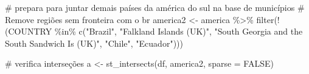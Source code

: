 \documentclass[
  letterpaper,
  DIV=11,
  numbers=noendperiod]{scrartcl}
\newenvironment{Shaded}{\begin{snugshade}}{\end{snugshade}}
\newcommand{\AttributeTok}[1]{\textcolor[rgb]{0.40,0.45,0.13}{#1}}
\newcommand{\CommentTok}[1]{\textcolor[rgb]{0.37,0.37,0.37}{#1}}
\newcommand{\ConstantTok}[1]{\textcolor[rgb]{0.56,0.35,0.01}{#1}}
\newcommand{\FunctionTok}[1]{\textcolor[rgb]{0.28,0.35,0.67}{#1}}
\newcommand{\NormalTok}[1]{\textcolor[rgb]{0.00,0.23,0.31}{#1}}
\newcommand{\OtherTok}[1]{\textcolor[rgb]{0.00,0.23,0.31}{#1}}
\newcommand{\SpecialCharTok}[1]{\textcolor[rgb]{0.37,0.37,0.37}{#1}}
\newcommand{\StringTok}[1]{\textcolor[rgb]{0.13,0.47,0.30}{#1}}
\begin{document}
\begin{Shaded}
\begin{Highlighting}[]
\CommentTok{\# prepara para juntar demais países da américa do sul na base de municípios}
\CommentTok{\# Remove regiões sem fronteira com o br}
\NormalTok{america2 }\OtherTok{\textless{}{-}}\NormalTok{ america }\SpecialCharTok{\%\textgreater{}\%}
  \FunctionTok{filter}\NormalTok{(}\SpecialCharTok{!}\NormalTok{(COUNTRY }\SpecialCharTok{\%in\%} \FunctionTok{c}\NormalTok{(}\StringTok{"Brazil"}\NormalTok{, }\StringTok{"Falkland Islands (UK)"}\NormalTok{,}
                          \StringTok{"South Georgia and the South Sandwich Is (UK)"}\NormalTok{, }\StringTok{"Chile"}\NormalTok{, }\StringTok{"Ecuador"}\NormalTok{)))}

\CommentTok{\# verifica interseções}
\NormalTok{a }\OtherTok{\textless{}{-}} \FunctionTok{st\_intersects}\NormalTok{(df, america2, }\AttributeTok{sparse =} \ConstantTok{FALSE}\NormalTok{)}


\end{Highlighting}
\end{Shaded}
\end{document}
